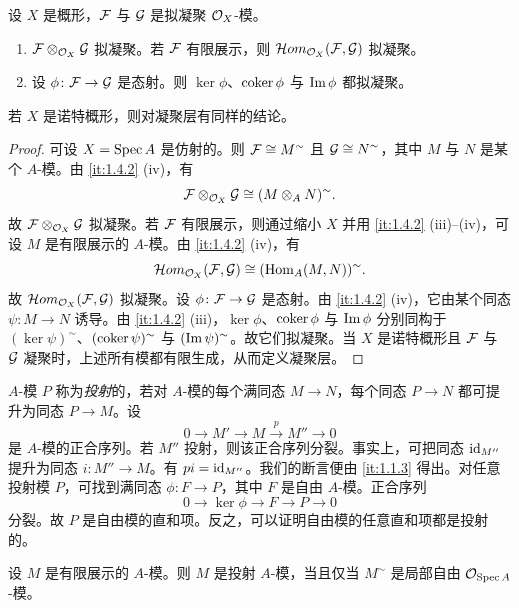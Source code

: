 \begin{corollary}\label{it:1.4.6}
设 $X$ 是概形，$\mathcal{F}$ 与 $\mathcal{G}$ 是拟凝聚 $\mathcal{O}_X$-模。
\begin{enumerate}[label=(\roman*),leftmargin=2.8em]
  \item $\mathcal{F}\otimes_{\mathcal{O}_X}\mathcal{G}$ 拟凝聚。若 $\mathcal{F}$ 有限展示，则 $\mathcal{H}om_{\mathcal{O}_X}(\mathcal{F},\mathcal{G})$ 拟凝聚。
  \item 设 $\phi\colon\mathcal{F}\to\mathcal{G}$ 是态射。则 $\ker\phi$、$\operatorname{coker}\phi$ 与 $\operatorname{Im}\phi$ 都拟凝聚。
\end{enumerate}
若 $X$ 是诺特概形，则对凝聚层有同样的结论。
\end{corollary}

\begin{proof}
可设 $X=\operatorname{Spec} A$ 是仿射的。则 $\mathcal{F}\cong M^\sim$ 且 $\mathcal{G}\cong N^\sim$，其中 $M$ 与 $N$ 是某个 $A$-模。由 \ref{it:1.4.2} (iv)，有
\[
\mathcal{F}\otimes_{\mathcal{O}_X}\mathcal{G}\cong(M\otimes_A N)^\sim.
\]
故 $\mathcal{F}\otimes_{\mathcal{O}_X}\mathcal{G}$ 拟凝聚。若 $\mathcal{F}$ 有限展示，则通过缩小 $X$ 并用 \ref{it:1.4.2} (iii)--(iv)，可设 $M$ 是有限展示的 $A$-模。由 \ref{it:1.4.2} (iv)，有
\[
\mathcal{H}om_{\mathcal{O}_X}(\mathcal{F},\mathcal{G})\cong(\operatorname{Hom}_A(M,N))^\sim.
\]
故 $\mathcal{H}om_{\mathcal{O}_X}(\mathcal{F},\mathcal{G})$ 拟凝聚。设 $\phi\colon\mathcal{F}\to\mathcal{G}$ 是态射。由 \ref{it:1.4.2} (iv)，它由某个同态 $\psi\colon M\to N$ 诱导。由 \ref{it:1.4.2} (iii)，$\ker\phi$、$\operatorname{coker}\phi$ 与 $\operatorname{Im}\phi$ 分别同构于 $(\ker\psi)^\sim$、$(\operatorname{coker}\psi)^\sim$ 与 $(\operatorname{Im}\psi)^\sim$。故它们拟凝聚。当 $X$ 是诺特概形且 $\mathcal{F}$ 与 $\mathcal{G}$ 凝聚时，上述所有模都有限生成，从而定义凝聚层。
\end{proof}

$A$-模 $P$ 称为\emph{投射}的，若对 $A$-模的每个满同态 $M\to N$，每个同态 $P\to N$ 都可提升为同态 $P\to M$。设
\[
0\to M'\to M\xrightarrow{p}M''\to0
\]
是 $A$-模的正合序列。若 $M''$ 投射，则该正合序列分裂。事实上，可把同态 $\operatorname{id}_{M''}$ 提升为同态 $i\colon M''\to M$。有 $pi=\operatorname{id}_{M''}$。我们的断言便由 \ref{it:1.1.3} 得出。对任意投射模 $P$，可找到满同态 $\phi\colon F\to P$，其中 $F$ 是自由 $A$-模。正合序列
\[
0\to\ker\phi\to F\to P\to0
\]
分裂。故 $P$ 是自由模的直和项。反之，可以证明自由模的任意直和项都是投射的。

\begin{proposition}\label{it:1.4.7}
设 $M$ 是有限展示的 $A$-模。则 $M$ 是投射 $A$-模，当且仅当 $M^\sim$ 是局部自由 $\mathcal{O}_{\operatorname{Spec} A}$-模。
\end{proposition}

